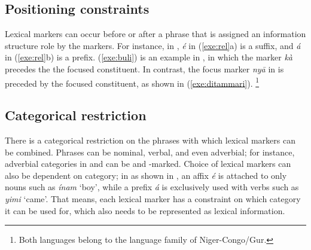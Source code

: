 \subsection{Positioning constraints}
\label{4:ssec:position}


Lexical markers can occur before or after a phrase that is assigned an
information structure role by the markers. For
instance, in , \textit{{\'e}} in (\ref{exe:rel}a) is a
suffix, and \textit{{\'a}} in (\ref{exe:rel}b) is a prefix.
(\ref{exe:buli}) is an example in , in which the 
marker \textit{k\`{a}} precedes the the focused constituent. In
contrast, the focus marker \textit{ny\={a}} in  is
preceded by the focused constituent, as shown in
(\ref{exe:ditammari}). \footnote{Both languages belong to the language
  family of Niger-Congo/Gur.}







\subsection{Categorical restriction}
\label{4:ssec:categorical}


There is a categorical restriction on the phrases with which lexical
markers can be combined. Phrases can be nominal, verbal, and even
adverbial; for instance, adverbial categories in  and
 can be \wa and \onun-marked.  Choice of lexical markers
can also be dependent on category; in  as shown in
, an affix \textit{{\'e}} is attached to only nouns
such as \textit{{\'i}nam} `boy', while a prefix \textit{{\'a}} is
exclusively used with verbs such as \textit{yimi} `came'. That means, each lexical marker has a constraint on which
category it can be used for, which also needs to be represented as
lexical information.


